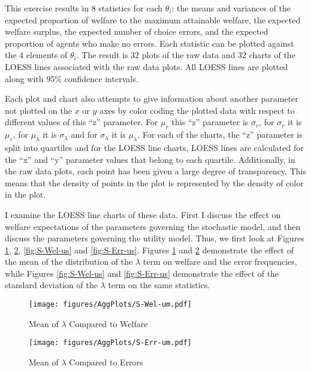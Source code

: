 \documentclass[../main.tex]{subfiles}
\begin{document}
This exercise results in 8 statistics for each $\theta_i$: the means and variances of the expected proportion of welfare to the maximum attainable welfare, the expected welfare surplus, the expected number of choice errors, and the expected proportion of agents who make no errors.
Each statistic can be plotted against the 4 elements of $\theta_i$.
The result is 32 plots of the raw data and 32 charts of the LOESS lines associated with the raw data plots.
All LOESS lines are plotted along with 95\% confidence intervals.

Each plot and chart also attempts to give information about another parameter not plotted on the $x$ or $y$ axes by color coding the plotted data with respect to different values of this \enquote{z} parameter.
For $\mu_r$ this \enquote{z} parameter is $\sigma_r$, for $\sigma_r$ it is $\mu_r$, for $\mu_\lambda$ it is $\sigma_\lambda$ and for $\sigma_\lambda$ it is $\mu_\lambda$.
For each of the charts, the \enquote{z} parameter is split into quartiles and for the LOESS line charts, LOESS lines are calculated for the \enquote{x} and \enquote{y} parameter values that belong to each quartile.
Additionally, in the raw data plots, each point has been given a large degree of transparency.
This means that the density of points in the plot is represented by the density of color in the plot.

I examine the LOESS line charts of these data.
First I discuss the effect on welfare expectations of the parameters governing the stochastic model, and then discuss the parameters governing the utility model.
Thus, we first look at Figures \ref{fig:S-Wel-um}, \ref{fig:S-Err-um}, \ref{fig:S-Wel-us} and \ref{fig:S-Err-us}.
Figures \ref{fig:S-Wel-um} and \ref{fig:S-Err-um} demonstrate the effect of the mean of the distribution of the $\lambda$ term on welfare and the error frequencies, while Figures \ref{fig:S-Wel-us} and \ref{fig:S-Err-us} demonstrate the effect of the standard deviation of the $\lambda$ term on the same statistics.

\begin{figure}[h!]
	\center
	\caption{Mean of $\lambda$ Compared to Welfare}
	\texttt{[image: figures/AggPlots/S-Wel-um.pdf]}
	\label{fig:S-Wel-um}
\end{figure}

\begin{figure}[h!]
	\center
	\caption{Mean of $\lambda$ Compared to Errors}
	\texttt{[image: figures/AggPlots/S-Err-um.pdf]}
	\label{fig:S-Err-um}
\end{figure}
\end{document}
